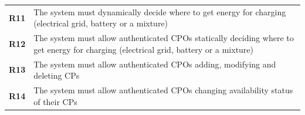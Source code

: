 \begin{table}[H]
\begin{tabularx}{\textwidth}{cX}
        \textbf{R11} & The system must dynamically decide where to get energy for charging (electrical grid, battery or a mixture)                                              \\
        \textbf{R12} & The system must allow authenticated CPOs statically deciding where to get energy for charging (electrical grid, battery or a mixture)                    \\
        \textbf{R13} & The system must allow authenticated CPOs adding, modifying and deleting CPs                                                                              \\
        \textbf{R14} & The system must allow authenticated CPOs changing availability status of their CPs                                                                       \\
        \bottomrule
    \end{tabularx}
\end{table}
